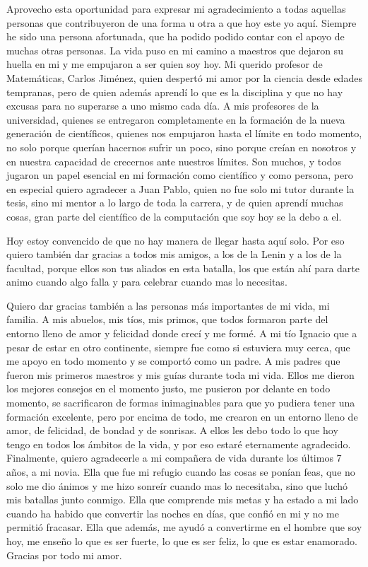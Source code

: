 \begin{acknowledgements}

Aprovecho esta oportunidad para expresar mi agradecimiento a todas aquellas personas que contribuyeron de una forma u otra a que hoy este yo aquí.
Siempre he sido una persona afortunada, que ha podido podido contar con el apoyo de muchas otras personas.
La vida puso en mi camino a maestros que dejaron su huella en mi y me empujaron a ser quien soy hoy.
Mi querido profesor de Matemáticas, Carlos Jiménez, quien despertó mi amor por la ciencia desde edades tempranas, pero de quien además aprendí lo que es la disciplina y que no hay excusas para no superarse a uno mismo cada día.
A mis profesores de la universidad, quienes se entregaron completamente en la formación de la nueva generación de científicos, quienes nos empujaron hasta el límite en todo momento, no solo porque querían hacernos sufrir un poco, sino porque creían en nosotros y en nuestra capacidad de crecernos ante nuestros límites.
Son muchos, y todos jugaron un papel esencial en mi formación como científico y como persona, pero en especial quiero agradecer a Juan Pablo, quien no fue solo mi tutor durante la tesis, sino mi mentor a lo largo de toda la carrera, y de quien aprendí muchas cosas, gran parte del científico de la computación que soy hoy se la debo a el.

Hoy estoy convencido de que no hay manera de llegar hasta aquí solo.
Por eso quiero también dar gracias a todos mis amigos, a los de la Lenin y a los de la facultad, porque ellos son tus aliados en esta batalla, los que están ahí para darte animo cuando algo falla y para celebrar cuando mas lo necesitas.

Quiero dar gracias también a las personas más importantes de mi vida, mi familia.
A mis abuelos, mis tíos, mis primos, que todos formaron parte del entorno lleno de amor y felicidad donde crecí y me formé.
A mi tío Ignacio que a pesar de estar en otro continente, siempre fue como si estuviera muy cerca, que me apoyo en todo momento y se comportó como un padre.
A mis padres que fueron mis primeros maestros y mis guías durante toda mi vida.
Ellos me dieron los mejores consejos en el momento justo, me pusieron por delante en todo momento, se sacrificaron de formas inimaginables para que yo pudiera tener una formación excelente, pero por encima de todo, me crearon en un entorno lleno de amor, de felicidad, de bondad y de sonrisas.
A ellos les debo todo lo que hoy tengo en todos los ámbitos de la vida, y por eso estaré eternamente agradecido.
Finalmente, quiero agradecerle a mi compañera de vida durante los últimos 7 años, a mi novia.
Ella que fue mi refugio cuando las cosas se ponían feas, que no solo me dio ánimos y me hizo sonreír cuando mas lo necesitaba, sino que luchó mis batallas junto conmigo.
Ella que comprende mis metas y ha estado a mi lado cuando ha habido que convertir las noches en días, que confió en mi y no me permitió fracasar.
Ella que además, me ayudó a convertirme en el hombre que soy hoy, me enseño lo que es ser fuerte, lo que es ser feliz, lo que es estar enamorado.
Gracias por todo mi amor.


\end{acknowledgements}
